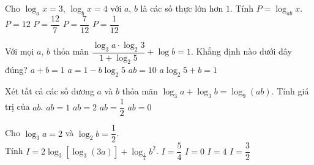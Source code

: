 \begin{ex}%
	[Mã 123 2017] Cho $\log_ax=3$, $\log_bx=4$ với $a$, $b$ là các số thực lớn hơn $1$. Tính $P=\log_{ab}x$. 
	 \choice
		{$P=12$} 
		{\True  $P=\dfrac{12}{7}$}
		 {$P=\dfrac{7}{12}$}
		{$P=\dfrac{1}{12}$} 
\end{ex}

\begin{ex}%
	Với mọi $a$, $b$ thỏa mãn $\dfrac{\log _3 a \cdot \log _2 3}{1+\log _2 5}+\log b=1$. Khẳng định nào dưới  đây đúng?
	 \choice
		{ $a+b=1$} 
		{ $a=1-b \log  _2 5$}
		{\True $a  b=10$}
		{$a  \log _2 5+b=1$}
\end{ex}

\begin{ex}%
	Xét tất cả các số dương $a$ và $b$ thỏa mãn $\log _3 a+\log  _3 b=\log _{9}(a b)$. Tính giá trị của $a b$.
	 \choice
		{\True $a  b=1$}
		{$a b=2$} 
		 {$a b=\dfrac{1}{2}$}
		 {$a b=0$}
\end{ex}

\begin{ex}%
	[Mã 105 2017] Cho $\log_3a=2$  và $\log_2b=\dfrac{1}{2}$. \\
	Tính $I=2\log_3\left[\log_3(3a)\right]+\log_{\frac{1}{4}}b^2$. 
	\choice 
		 {$I=\dfrac{5}{4}$}
		{$I=0$} 
		{$I=4$} 
		{\True  $I=\dfrac{3}{2}$}
\end{ex}

